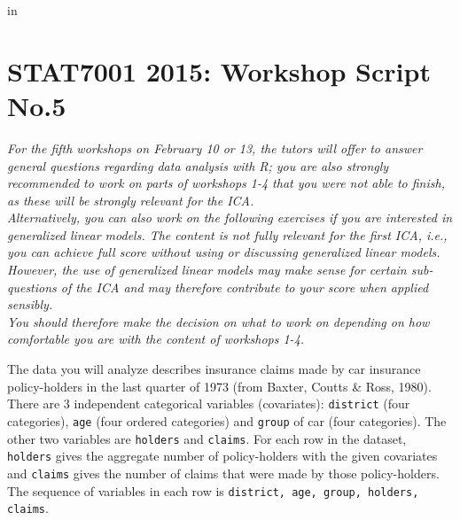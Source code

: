 
\topmargin   -3cm
\textwidth   6.2in
 in



\section*{STAT7001 2015: Workshop Script No.5}
{\em For the fifth workshops on February 10 or 13, the tutors will offer to answer general questions regarding data analysis with R; you are also strongly recommended to work on parts of workshops 1-4 that you were not able to finish, as these will be strongly relevant for the ICA.\\ Alternatively, you can also work on the following exercises if you are interested in generalized linear models. The content is not fully relevant for the first ICA, i.e., you can achieve full score without using or discussing generalized linear models. However, the use of generalized linear models may make sense for certain sub-questions of the ICA and may therefore contribute to your score when applied sensibly.\\
You should therefore make the decision on what to work on depending on how comfortable you are with the content of workshops 1-4. }

The data you will analyze describes insurance claims made by car
insurance policy-holders in the last quarter of 1973 (from Baxter, Coutts \& Ross, 1980). There are 3 independent categorical variables (covariates): {\tt district} (four categories), {\tt age} (four ordered categories) and {\tt group} of car (four categories). The other two variables are {\tt holders} and {\tt claims}.  For each row in the dataset, {\tt holders} gives the aggregate number of policy-holders with the given covariates and {\tt claims} gives the number of claims that were made by those policy-holders. The sequence of variables in each row is {\tt district, age, group, holders, claims}.

